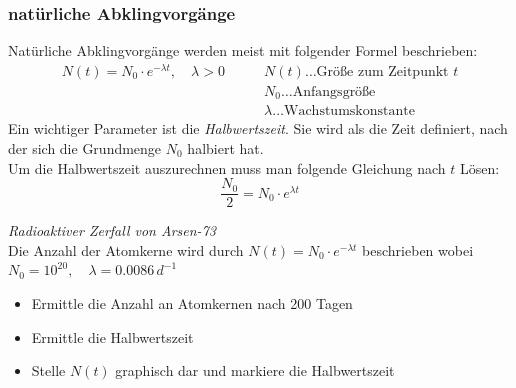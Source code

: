 \subsubsection{natürliche Abklingvorgänge}
Natürliche Abklingvorgänge werden meist mit folgender Formel beschrieben:
\begin{align}
    N(t)=N_0 \cdot e^{-\lambda t},\quad \lambda > 0 \qquad  &N(t) \dots \text{Größe zum Zeitpunkt } t \\
                                                           &N_0 \dots \text{Anfangsgröße} \nonumber \\
                                                           &\lambda \dots \text{Wachstumskonstante} \nonumber
\end{align}
Ein wichtiger Parameter ist die \emph{Halbwertszeit}. Sie wird als die Zeit definiert, nach der sich die Grundmenge $N_0$ halbiert hat.\\
Um die Halbwertszeit auszurechnen muss man folgende Gleichung nach $t$ Lösen:
\begin{equation}
    \frac{N_0}{2} = N_0 \cdot e^{\lambda t}
    \label{eq:halbwertszeit}
\end{equation}
\vspace{20pt}
\begin{aufgabe}
    \emph{Radioaktiver Zerfall von Arsen-73} \\[2pt]
    Die Anzahl der Atomkerne wird durch $N(t)=N_0 \cdot e^{-\lambda t}$ beschrieben wobei\\
    $N_0=10^{20},\quad \lambda = 0.0086\,d^{-1}$
    \begin{itemize}
        \item[1.] Ermittle die Anzahl an Atomkernen nach 200 Tagen
        \item[2.] Ermittle die Halbwertszeit
        \item[3.] Stelle $N(t)$ graphisch dar und markiere die Halbwertszeit
    \end{itemize}
\end{aufgabe}
